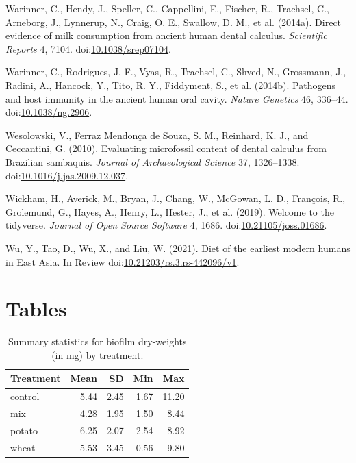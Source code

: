 \documentclass[utf8]{frontiers/frontiersSCNS}
\newlength{\cslhangindent}
\newlength{\cslentryspacingunit} %
\newenvironment{CSLReferences}[2] %
 {%
  \setlength{\parindent}{0pt}
  \ifodd #1
  \let\oldpar\par
  \def\par{\hangindent=\cslhangindent\oldpar}
  \fi
  \setlength{\parskip}{#2\cslentryspacingunit}
 }%
 {}
\begin{document}
\begin{CSLReferences}{1}{0}
\leavevmode{}%
Warinner, C., Hendy, J., Speller, C., Cappellini, E., Fischer, R., Trachsel, C., Arneborg, J., Lynnerup, N., Craig, O. E., Swallow, D. M., et al. (2014a). Direct evidence of milk consumption from ancient human dental calculus. \emph{Scientific Reports} 4, 7104. doi:\href{https://doi.org/10.1038/srep07104}{10.1038/srep07104}.

\leavevmode{}%
Warinner, C., Rodrigues, J. F., Vyas, R., Trachsel, C., Shved, N., Grossmann, J., Radini, A., Hancock, Y., Tito, R. Y., Fiddyment, S., et al. (2014b). Pathogens and host immunity in the ancient human oral cavity. \emph{Nature Genetics} 46, 336--44. doi:\href{https://doi.org/10.1038/ng.2906}{10.1038/ng.2906}.

\leavevmode{}%
Wesolowski, V., Ferraz Mendonça de Souza, S. M., Reinhard, K. J., and Ceccantini, G. (2010). Evaluating microfossil content of dental calculus from {Brazilian} sambaquis. \emph{Journal of Archaeological Science} 37, 1326--1338. doi:\href{https://doi.org/10.1016/j.jas.2009.12.037}{10.1016/j.jas.2009.12.037}.

\leavevmode{}%
Wickham, H., Averick, M., Bryan, J., Chang, W., McGowan, L. D., François, R., Grolemund, G., Hayes, A., Henry, L., Hester, J., et al. (2019). Welcome to the {tidyverse}. \emph{Journal of Open Source Software} 4, 1686. doi:\href{https://doi.org/10.21105/joss.01686}{10.21105/joss.01686}.

\leavevmode{}%
Wu, Y., Tao, D., Wu, X., and Liu, W. (2021). Diet of the earliest modern humans in {East Asia}. {In Review} doi:\href{https://doi.org/10.21203/rs.3.rs-442096/v1}{10.21203/rs.3.rs-442096/v1}.

\end{CSLReferences}

\clearpage

\hypertarget{tables}{%
\section*{Tables}\label{tables}}

\begin{table}

\caption{\label{tab:anova-tbl}Summary statistics for biofilm dry-weights (in mg) by treatment.}
\centering
\begin{tabular}[t]{l|r|r|r|r}
\hline
Treatment & Mean & SD & Min & Max\\
\hline
control & 5.44 & 2.45 & 1.67 & 11.20\\
\hline
mix & 4.28 & 1.95 & 1.50 & 8.44\\
\hline
potato & 6.25 & 2.07 & 2.54 & 8.92\\
\hline
wheat & 5.53 & 3.45 & 0.56 & 9.80\\
\hline
\end{tabular}
\end{table}
\end{document}
